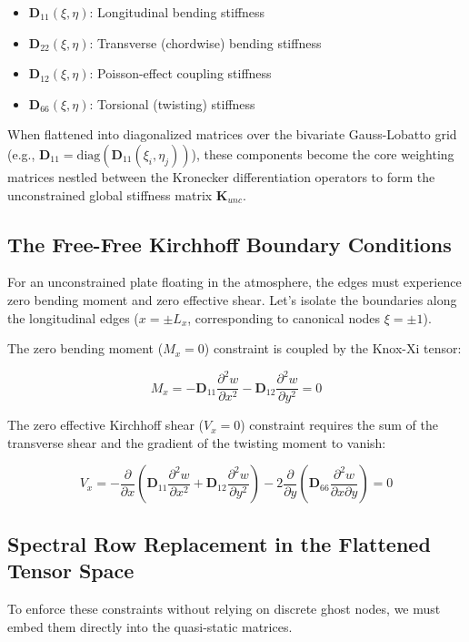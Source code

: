 \documentclass[11pt,a4paper]{article}
\theoremstyle{definition}
\numberwithin{equation}{section}
\begin{document}
\begin{itemize}
    \item $\mathbf{D}_{11}(\xi, \eta)$: Longitudinal bending stiffness
    \item $\mathbf{D}_{22}(\xi, \eta)$: Transverse (chordwise) bending stiffness
    \item $\mathbf{D}_{12}(\xi, \eta)$: Poisson-effect coupling stiffness
    \item $\mathbf{D}_{66}(\xi, \eta)$: Torsional (twisting) stiffness
\end{itemize}

When flattened into diagonalized matrices over the bivariate Gauss-Lobatto grid (e.g., $\mathbf{D}_{11} = \text{diag}(\mathbf{D}_{11}(\xi_i, \eta_j))$), these components become the core weighting matrices nestled between the Kronecker differentiation operators to form the unconstrained global stiffness matrix $\mathbf{K}_{unc}$.

\subsection{The Free-Free Kirchhoff Boundary Conditions}
For an unconstrained plate floating in the atmosphere, the edges must experience zero bending moment and zero effective shear. Let's isolate the boundaries along the longitudinal edges ($x = \pm L_x$, corresponding to canonical nodes $\xi = \pm 1$).

The zero bending moment ($M_x = 0$) constraint is coupled by the Knox-Xi tensor:

$$M_x = -\mathbf{D}_{11} \frac{\partial^2 w}{\partial x^2} - \mathbf{D}_{12} \frac{\partial^2 w}{\partial y^2} = 0$$

The zero effective Kirchhoff shear ($V_x = 0$) constraint requires the sum of the transverse shear and the gradient of the twisting moment to vanish:

$$V_x = -\frac{\partial}{\partial x} \left( \mathbf{D}_{11} \frac{\partial^2 w}{\partial x^2} + \mathbf{D}_{12} \frac{\partial^2 w}{\partial y^2} \right) - 2 \frac{\partial}{\partial y} \left( \mathbf{D}_{66} \frac{\partial^2 w}{\partial x \partial y} \right) = 0$$

\subsection{Spectral Row Replacement in the Flattened Tensor Space}
To enforce these constraints without relying on discrete ghost nodes, we must embed them directly into the quasi-static matrices.
\end{document}
